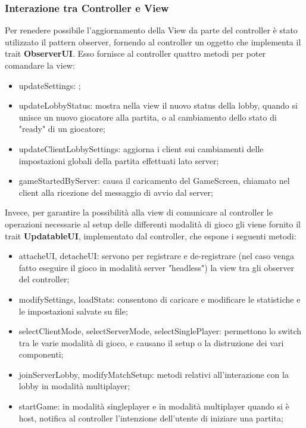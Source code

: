 \subsubsection{Interazione tra Controller e View}
Per renedere possibile l'aggiornamento della View da parte del controller è stato utilizzato il pattern observer, fornendo al controller un oggetto che implementa il trait \textbf{ObserverUI}. Esso fornisce al controller quattro metodi per poter comandare la view: 
\begin{itemize}
    \item updateSettings: ;
    \item updateLobbyStatus: mostra nella view il nuovo status della lobby, quando si unisce un nuovo giocatore alla partita, o al cambiamento dello stato di "ready" di un giocatore;
    \item updateClientLobbySettings: aggiorna i client sui cambiamenti delle impostazioni globali della partita effettuati lato server; 
    \item gameStartedByServer: causa il caricamento del GameScreen, chiamato nel client alla ricezione del messaggio di avvio dal server;
\end{itemize}



Invece, per garantire la possibilità alla view di comunicare al controller le operazioni necessarie al setup delle differenti modalità di gioco gli viene fornito il trait \textbf{UpdatableUI}, implementato dal controller, che espone i seguenti metodi:
\begin{itemize}
    \item attacheUI, detacheUI: servono per registrare e de-registrare (nel caso venga fatto eseguire il gioco in modalità server "headless") la view tra gli observer del controller;
    \item modifySettings, loadStats: consentono di caricare e modificare le statistiche e le impostazioni salvate su file;
    \item selectClientMode, selectServerMode, selectSinglePlayer: permettono lo switch tra le varie modalità di gioco, e causano il setup o la distruzione dei vari componenti;
    \item joinServerLobby, modifyMatchSetup: metodi relativi all'interazione con la lobby in modalità multiplayer;
    \item startGame: in modalità singleplayer e in modalità multiplayer quando si è host, notifica al controller l'intenzione dell'utente di iniziare una partita;
\end{itemize}




